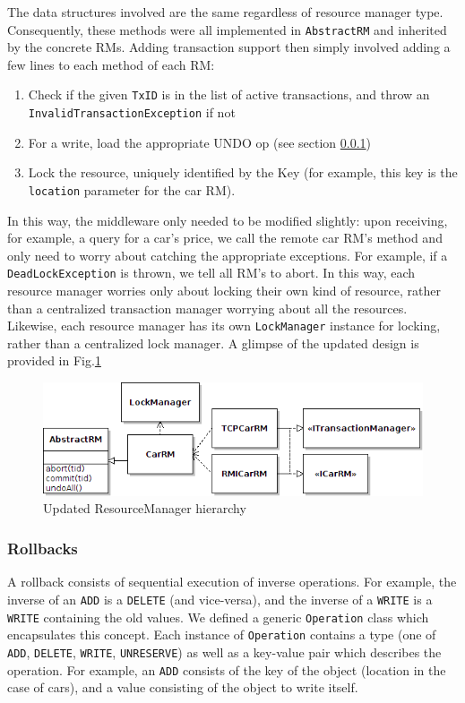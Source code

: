 \documentclass[a4paper]{article}
\begin{document}
The data structures involved are the same regardless of resource manager type. Consequently, these methods were all implemented in \texttt{AbstractRM} and inherited by the concrete RMs. Adding transaction support then simply involved adding a few lines to each method of each RM:
\begin{enumerate}
 \item[1.] Check if the given \texttt{TxID} is in the list of active transactions, and throw an \texttt{InvalidTransactionException} if not
 \item[2.] For a write, load the appropriate UNDO op (see section \ref{rollbacks})
 \item[3.] Lock the resource, uniquely identified by the Key (for example, this key is the \texttt{location} parameter for the car RM).
\end{enumerate}
In this way, the middleware only needed to be modified slightly: upon receiving, for example, a query for a car's price, we call the remote car RM's method and only need to worry about catching the appropriate exceptions. For example, if a 
\texttt{DeadLockException} is thrown, we tell all RM's to abort. In this way, each resource manager worries only about locking their own kind of resource, rather than a centralized transaction manager worrying about all the resources.
Likewise, each resource manager has its own \texttt{LockManager} instance for locking, rather than a centralized lock manager. A glimpse of the updated design is provided in Fig.\ref{txncarrm}
\begin{figure}[h!]
  \centering
	\includegraphics[scale=0.6]{txncarrm.png}
  \caption{Updated ResourceManager hierarchy}
  \label{txncarrm}
\end{figure}

\subsubsection{Rollbacks}
\label{rollbacks}

A rollback consists of sequential execution of inverse operations. For example, the inverse of an \texttt{ADD} is a \texttt{DELETE} (and vice-versa), and the inverse of a \texttt{WRITE} is a \texttt{WRITE} containing the old values. 
We defined a generic \texttt{Operation} class which encapsulates this concept. Each instance of \texttt{Operation} contains a type (one of \texttt{ADD}, \texttt{DELETE}, \texttt{WRITE}, \texttt{UNRESERVE}) as well as a key-value pair
which describes the operation. For example, an \texttt{ADD} consists of the key of the object (location in the case of cars), and a value consisting of the object to write itself. 
\end{document}
